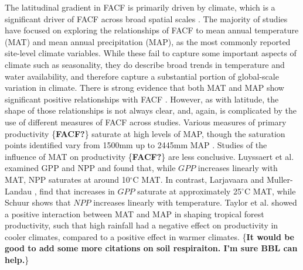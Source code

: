 \documentclass[]{article}
\begin{document}
The latitudinal gradient in FACF is primarily driven by climate, which
is a significant driver of FACF across broad spatial scales
\citep{luyssaert_co_2007, cleveland_relationships_2011, hursh_sensitivity_2017}.
The majority of studies have focused on exploring the relationships of
FACF to mean annual temperature (MAT) and mean annual precipitation
(MAP), as the most commonly reported site-level climate variables. While
these fail to capture some important aspects of climate such as
seasonality, they do describe broad trends in temperature and water
availability, and therefore capture a substantial portion of
global-scale variation in climate. There is strong evidence that both
MAT and MAP show significant positive relationships with FACF
\citep{chu_does_2016}. However, as with latitude, the shape of those
relationships is not always clear, and, again, is complicated by the use
of different measures of FACF across studies. Various measures of
primary productivity \{\textbf{FACF?}\} saturate at high levels of MAP,
though the saturation points identified vary from 1500mm
\citep{luyssaert_co_2007} up to 2445mm MAP
\citep{schuur_productivity_2003}. Studies of the influence of MAT on
productivity \{\textbf{FACF?}\} are less conclusive. Luyssaert et al.
\citeyearpar{luyssaert_co_2007} examined GPP and NPP and found that,
while \(GPP\) increases linearly with MAT, NPP saturates at around
10\(^\circ\)C MAT. In contrast, Larjavaara and Muller-Landau
\citeyearpar{larjavaara_temperature_2012}, find that increases in
\(GPP\) saturate at approximately 25\(^\circ\)C MAT, while Schuur
\citeyearpar{schuur_productivity_2003} shows that \(NPP\) increases
linearly with temperature. Taylor et al.
\citeyearpar{taylor_temperature_2017} showed a positive interaction
between MAT and MAP in shaping tropical forest productivity, such that
high rainfall had a negative effect on productivity in cooler climates,
compared to a positive effect in warmer climates. \{\textbf{It would be
good to add some more citations on soil respiraiton. I'm sure BBL can
help.}\}
\end{document}
